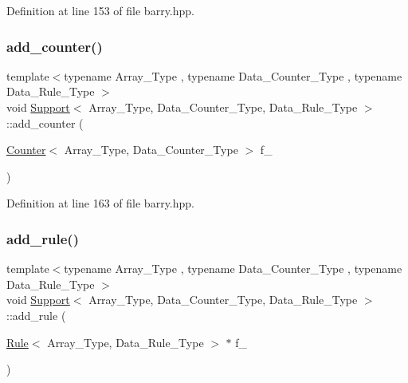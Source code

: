 Definition at line 153 of file barry.\+hpp.

\mbox{\label{classbarry_1_1_support_a00d511970c0bf833ef8bdd7580c670cc}} 
\subsubsection{\texorpdfstring{add\+\_\+counter()}{add\_counter()}\hspace{0.1cm}{\footnotesize\ttfamily [2/2]}}
{\footnotesize\ttfamily template$<$typename Array\+\_\+\+Type , typename Data\+\_\+\+Counter\+\_\+\+Type , typename Data\+\_\+\+Rule\+\_\+\+Type $>$ \\
void \hyperlink{classbarry_1_1_support}{Support}$<$ Array\+\_\+\+Type, Data\+\_\+\+Counter\+\_\+\+Type, Data\+\_\+\+Rule\+\_\+\+Type $>$\+::add\+\_\+counter (\begin{DoxyParamCaption}\item[{\hyperlink{classbarry_1_1_counter}{Counter}$<$ Array\+\_\+\+Type, Data\+\_\+\+Counter\+\_\+\+Type $>$}]{f\+\_\+ }\end{DoxyParamCaption})\hspace{0.3cm}{\ttfamily [inline]}}



Definition at line 163 of file barry.\+hpp.

\mbox{\label{classbarry_1_1_support_a3113a4586c541aa25db7b4a864b748a2}} 
\subsubsection{\texorpdfstring{add\+\_\+rule()}{add\_rule()}\hspace{0.1cm}{\footnotesize\ttfamily [1/2]}}
{\footnotesize\ttfamily template$<$typename Array\+\_\+\+Type , typename Data\+\_\+\+Counter\+\_\+\+Type , typename Data\+\_\+\+Rule\+\_\+\+Type $>$ \\
void \hyperlink{classbarry_1_1_support}{Support}$<$ Array\+\_\+\+Type, Data\+\_\+\+Counter\+\_\+\+Type, Data\+\_\+\+Rule\+\_\+\+Type $>$\+::add\+\_\+rule (\begin{DoxyParamCaption}\item[{\hyperlink{classbarry_1_1_rule}{Rule}$<$ Array\+\_\+\+Type, Data\+\_\+\+Rule\+\_\+\+Type $>$ $\ast$}]{f\+\_\+ }\end{DoxyParamCaption})\hspace{0.3cm}{\ttfamily [inline]}}



